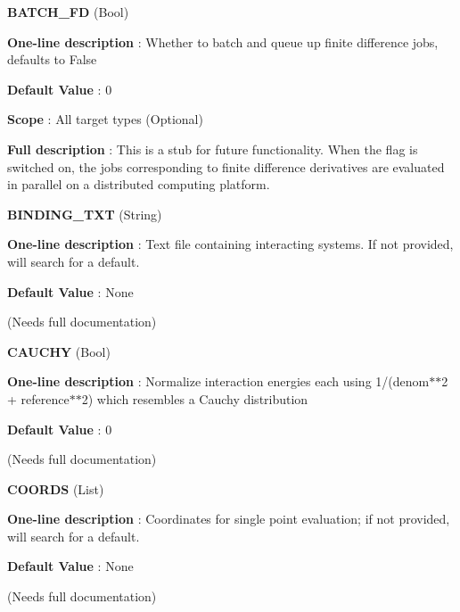 \begin{DoxyItemize}
\item {\bfseries  B\-A\-T\-C\-H\-\_\-\-F\-D } (Bool) \par
{\bfseries  One-\/line description }\-: Whether to batch and queue up finite difference jobs, defaults to False \par
{\bfseries  Default Value }\-: 0 \par
{\bfseries  Scope }\-: All target types (Optional) \par
{\bfseries  Full description }\-: This is a stub for future functionality. When the flag is switched on, the jobs corresponding to finite difference derivatives are evaluated in parallel on a distributed computing platform.\end{DoxyItemize}
\begin{DoxyItemize}
\item {\bfseries  B\-I\-N\-D\-I\-N\-G\-\_\-\-T\-X\-T } (String) \par
{\bfseries  One-\/line description }\-: Text file containing interacting systems. If not provided, will search for a default. \par
{\bfseries  Default Value }\-: None \par
(Needs full documentation)\end{DoxyItemize}
\begin{DoxyItemize}
\item {\bfseries  C\-A\-U\-C\-H\-Y } (Bool) \par
{\bfseries  One-\/line description }\-: Normalize interaction energies each using 1/(denom$\ast$$\ast$2 + reference$\ast$$\ast$2) which resembles a Cauchy distribution \par
{\bfseries  Default Value }\-: 0 \par
(Needs full documentation)\end{DoxyItemize}
\begin{DoxyItemize}
\item {\bfseries  C\-O\-O\-R\-D\-S } (List) \par
{\bfseries  One-\/line description }\-: Coordinates for single point evaluation; if not provided, will search for a default. \par
{\bfseries  Default Value }\-: None \par
(Needs full documentation)\end{DoxyItemize}
